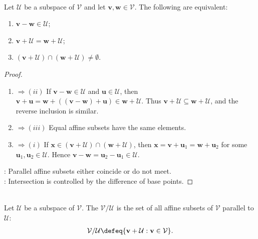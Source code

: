 \begin{proposition} \label{prop:parallel-affine-subsets-equal-or-disjoint} \\
Let $\mathcal{U}$ be a subspace of $\mathcal{V}$ and let $\mathbf{v},\mathbf{w}\in\mathcal{V}$. The following are equivalent:
\begin{enumerate}[label=(\roman*)]
\setlength{\itemsep}{0pt}
\item $\mathbf{v}-\mathbf{w}\in\mathcal{U}$;
\item $\mathbf{v}+\mathcal{U}=\mathbf{w}+\mathcal{U}$;
\item $(\mathbf{v}+\mathcal{U})\cap(\mathbf{w}+\mathcal{U})\neq\emptyset$.
\end{enumerate}
\begin{proof}
\begin{enumerate}[label=(\roman)*.]
\setlength{\itemsep}{0pt}
\item[$(i)$]$\Rightarrow (ii)$ If $\mathbf{v}-\mathbf{w}\in\mathcal{U}$ and $\mathbf{u}\in\mathcal{U}$, then $\mathbf{v}+\mathbf{u}=\mathbf{w}+((\mathbf{v}-\mathbf{w})+\mathbf{u})\in\mathbf{w}+\mathcal{U}$. Thus $\mathbf{v}+\mathcal{U}\subseteq\mathbf{w}+\mathcal{U}$, and the reverse inclusion is similar.
\item[$(ii)$]$\Rightarrow (iii)$ Equal affine subsets have the same elements.
\item[$(iii)$]$\Rightarrow (i)$ If $\mathbf{x}\in(\mathbf{v}+\mathcal{U})\cap(\mathbf{w}+\mathcal{U})$, then $\mathbf{x}=\mathbf{v}+\mathbf{u}_1=\mathbf{w}+\mathbf{u}_2$ for some $\mathbf{u}_1,\mathbf{u}_2\in\mathcal{U}$. Hence $\mathbf{v}-\mathbf{w}=\mathbf{u}_2-\mathbf{u}_1\in\mathcal{U}$.
\end{enumerate}
: Parallel affine subsets either coincide or do not meet.\\
: Intersection is controlled by the difference of base points.
\end{proof}
\end{proposition}

\begin{definition} \\
Let $\mathcal{U}$ be a subspace of $\mathcal{V}$. The  $\mathcal{V}/\mathcal{U}$ is the set of all affine subsets of $\mathcal{V}$ parallel to $\mathcal{U}$:
\begin{align}
\mathcal{V}/\mathcal{U}\defeq\{\mathbf{v}+\mathcal{U}:\mathbf{v}\in\mathcal{V}\}. \nonumber
\end{align}
\end{definition}

